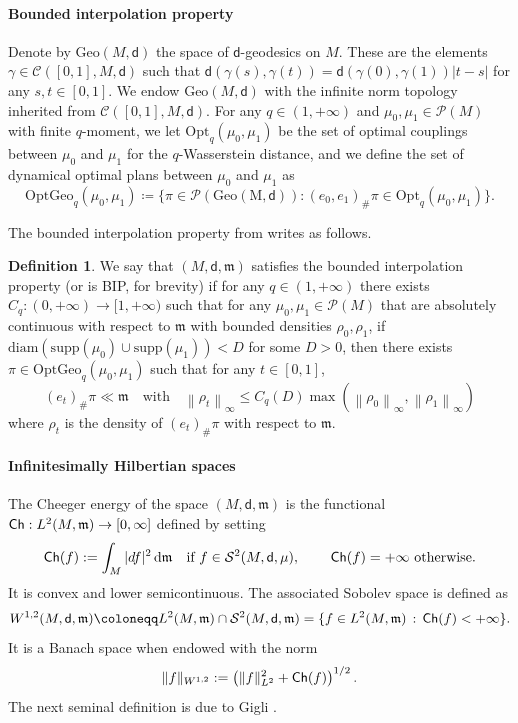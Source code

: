 \documentclass[10pt]{article}
\newcommand{\cC}{\mathcal{C}}
\newcommand{\m}{\mathfrak{m}}
\renewcommand{\d}{\,\mathrm{d}}
\newcommand{\dist}{\mathsf{d}}
\newcommand{\df}{\coloneqq}
\newcommand{\Ch}{{\sf Ch}}
\theoremstyle{plain}
\theoremstyle{definition}
\newtheorem{definition}[theorem]{Definition}
\newcommand{\Ltwo}{L^2(M,\m)}
\begin{document}
\paragraph{Bounded interpolation property} Denote by $\mathrm{Geo}(M,\dist)$ the space of $\dist$-geodesics on $M$. These are the elements $\gamma \in \cC([0,1],M,\dist)$ such that $\dist(\gamma(s),\gamma(t)) = \dist(\gamma(0),\gamma(1)) |t-s|$ for any $s,t \in [0,1]$. We endow $\mathrm{Geo}(M,\dist)$ with the infinite norm topology inherited from $\cC([0,1],M,\dist)$.  For any $q \in (1,+\infty)$ and $\mu_0,\mu_1 \in \mathcal{P}(M)$ with finite $q$-moment, we let $\mathrm{Opt}_q(\mu_0,\mu_1)$ be the set of optimal couplings between $\mu_0$ and $\mu_1$ for the $q$-Wasserstein distance, and we define the set of dynamical optimal plans between $\mu_0$ and $\mu_1$ as
\[
\mathrm{OptGeo}_q(\mu_0,\mu_1) \df \{\pi \in \mathcal{P}(\mathrm{Geo(M,\dist)}) : (e_0,e_1)_\# \pi \in \mathrm{Opt}_q(\mu_0,\mu_1) \}.
\]

The bounded interpolation property  from \cite{GigliNobili} writes as follows.

\begin{definition}\label{Def:BIP}
    We say that $(M,\dist,\m)$ satisfies the bounded interpolation property (or is BIP, for brevity) if for any $q \in (1,+\infty)$ there exists $C_q : (0,+\infty) \to [1,+\infty)$ such that for any $\mu_0,\mu_1 \in \mathcal{P}(M)$ that are absolutely continuous with respect to $\m$ with bounded densities $\rho_0,\rho_1$, if $\mathrm{diam}(\mathrm{supp}(\mu_0) \cup \mathrm{supp}(\mu_1) ) < D$ for some $D>0$, then there exists $\pi \in \mathrm{OptGeo}_q(\mu_0,\mu_1)$ such that for any $t \in [0,1]$,
    \[
    (e_t)_\# \pi  \ll \m \quad \text{with} \quad \left\| \rho_t \right\|_\infty \le C_q(D)   \max \left( \left\| \rho_0\right\|_\infty,\left\| \rho_1 \right\|_\infty \right)
    \]
    where $\rho_t$ is the density of $(e_t)_\# \pi$ with respect to $\m$.
\end{definition}



\paragraph{Infinitesimally Hilbertian spaces} The Cheeger energy of the space $(M,\dist,\m)$ is the functional $\Ch:\Ltwo\to [0,\infty]$ defined by setting
\[\Ch (f) :=\int_M|d f|^2\d\m \quad \text{if $f \in \mathcal{S}^2(M,\dist,\mu),$} \qquad \text{ $\Ch (f)=+\infty$ otherwise.}\] 
 It is convex and lower semicontinuous. The associated Sobolev space is defined as
\[
W^{1,2}(M,\dist,\m) \df L^2(M,\m) \cap \mathcal{S}^2(M,\dist,\m) = \{f \in \Ltwo \, : \, \Ch(f) < +\infty\}.
\]
It is a Banach space when endowed with the norm
$$
\|f\|_{W^{1,2}}:=\left(\|f\|_{L^2}^2+\Ch(f)\right)^{1/2}.
$$
The next seminal definition is due to Gigli \cite{Gigli15}.
\end{document}
